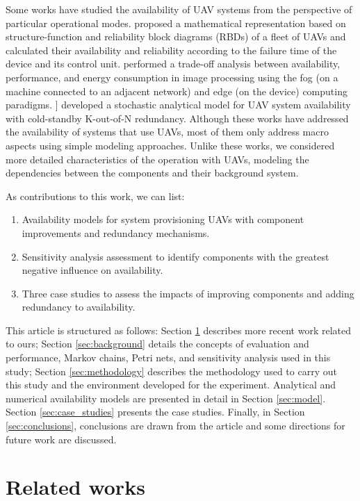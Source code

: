 \documentclass[conference]{IEEEtran}
\begin{document}
Some works have studied the availability of UAV systems from the perspective of particular operational modes. \citet{Zaitseva2020, rusnak2019reliability} proposed a mathematical representation based on structure-function and reliability block diagrams (RBDs) of a fleet of UAVs and calculated their availability and reliability according to the failure time of the device and its control unit. \citet{Machida2021, Report} performed a trade-off analysis between availability, performance, and energy consumption in image processing using the fog (on a machine connected to an adjacent network) and edge (on the device) computing paradigms. \citet{Maccarthy2019} ] developed a stochastic analytical model for UAV system availability with cold-standby K-out-of-N redundancy. Although these works have addressed the availability of systems that use UAVs, most of them only address macro aspects using simple modeling approaches. Unlike these works, we considered more detailed characteristics of the operation with UAVs, modeling the dependencies between the components and their background system.

As contributions to this work, we can list:
\begin{enumerate}
     \item Availability models for system provisioning UAVs with component improvements and redundancy mechanisms.
     \item Sensitivity analysis assessment to identify components with the greatest negative influence on availability.
     \item Three case studies to assess the impacts of improving components and adding redundancy to availability.
\end{enumerate}

This article is structured as follows: Section \ref{sec:related_works} describes more recent work related to ours; Section \ref{sec:background} details the concepts of evaluation and performance, Markov chains, Petri nets, and sensitivity analysis used in this study; Section \ref{sec:methodology} describes the methodology used to carry out this study and the environment developed for the experiment. Analytical and numerical availability models are presented in detail in Section \ref{sec:model}. Section \ref{sec:case_studies} presents the case studies. Finally, in Section \ref{sec:conclusions}, conclusions are drawn from the article and some directions for future work are discussed.


\section{Related works}\label{sec:related_works}
\end{document}
